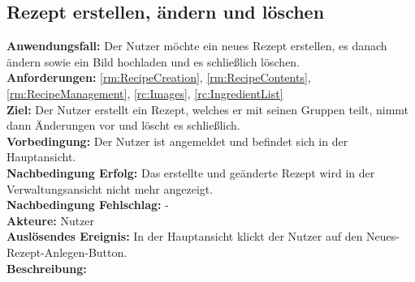 \documentclass[parskip=full]{scrartcl}
\begin{document}
\subsection{Rezept erstellen, ändern und löschen}
\textbf{Anwendungsfall:} Der Nutzer möchte ein neues Rezept erstellen, es danach ändern sowie ein Bild hochladen und es schließlich löschen.\\
\textbf{Anforderungen:} \ref{rm:RecipeCreation}, \ref{rm:RecipeContents}, \ref{rm:RecipeManagement}, \ref{rc:Images}, \ref{rc:IngredientList}\\
\textbf{Ziel:} Der Nutzer erstellt ein Rezept, welches er mit seinen Gruppen teilt, nimmt dann Änderungen vor und löscht es schließlich.\\
\textbf{Vorbedingung:} Der Nutzer ist angemeldet und befindet sich in der Hauptansicht.\\
\textbf{Nachbedingung Erfolg:} Das erstellte und geänderte Rezept wird in der Verwaltungsansicht nicht mehr angezeigt.  \\
\textbf{Nachbedingung Fehlschlag:} -\\
\textbf{Akteure:} Nutzer\\
\textbf{Auslösendes Ereignis:} In der Hauptansicht klickt der Nutzer auf den Neues-Rezept-Anlegen-Button.\\
\textbf{Beschreibung:}
\end{document}
